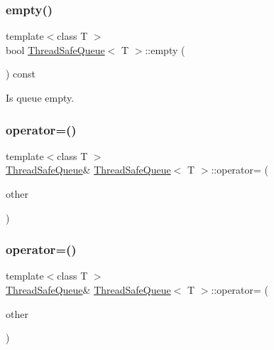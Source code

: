 \subsubsection{\texorpdfstring{empty()}{empty()}}
{\footnotesize\ttfamily template$<$class T $>$ \\
bool \hyperlink{class_thread_safe_queue}{Thread\+Safe\+Queue}$<$ T $>$\+::empty (\begin{DoxyParamCaption}{ }\end{DoxyParamCaption}) const\hspace{0.3cm}{\ttfamily [inline]}}



Is queue empty. 

\mbox{\label{class_thread_safe_queue_a6efd6d8c1d87c21d5bb422e18775e410}} 
\subsubsection{\texorpdfstring{operator=()}{operator=()}\hspace{0.1cm}{\footnotesize\ttfamily [1/2]}}
{\footnotesize\ttfamily template$<$class T $>$ \\
\hyperlink{class_thread_safe_queue}{Thread\+Safe\+Queue}\& \hyperlink{class_thread_safe_queue}{Thread\+Safe\+Queue}$<$ T $>$\+::operator= (\begin{DoxyParamCaption}\item[{\hyperlink{class_thread_safe_queue}{Thread\+Safe\+Queue}$<$ T $>$}]{other }\end{DoxyParamCaption})\hspace{0.3cm}{\ttfamily [delete]}}

\mbox{\label{class_thread_safe_queue_a10875bf953a8841619ba5bfa92e618be}} 
\subsubsection{\texorpdfstring{operator=()}{operator=()}\hspace{0.1cm}{\footnotesize\ttfamily [2/2]}}
{\footnotesize\ttfamily template$<$class T $>$ \\
\hyperlink{class_thread_safe_queue}{Thread\+Safe\+Queue}\& \hyperlink{class_thread_safe_queue}{Thread\+Safe\+Queue}$<$ T $>$\+::operator= (\begin{DoxyParamCaption}\item[{\hyperlink{class_thread_safe_queue}{Thread\+Safe\+Queue}$<$ T $>$ \&\&}]{other }\end{DoxyParamCaption})\hspace{0.3cm}{\ttfamily [delete]}}

